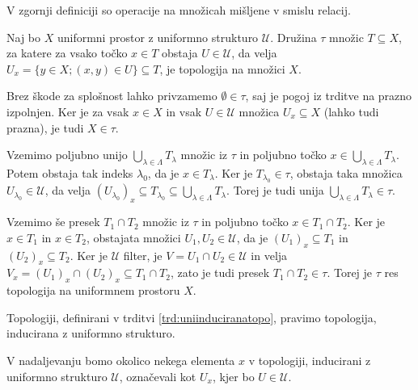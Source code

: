 \documentclass[mat1]{fmfdelo}
\newcommand{\Ucurl}{\mathcal{U}}
\begin{document}
\begin{opomba}
	V zgornji definiciji so operacije na množicah mišljene v smislu relacij.
\end{opomba}

\begin{trditev}\label{trd:uniinduciranatopo}
Naj bo $X$ uniformni prostor z uniformno strukturo $\mathcal{U}$. Družina $\tau$ množic $T \subseteq X$, za katere za vsako točko $x \in T$ obstaja $U \in \mathcal{U}$, da velja $U_x = \lbrace y \in X ; (x, y) \in U \rbrace \subseteq T$, je topologija na množici $X$.
\end{trditev}

\begin{dokaz}
Brez škode za splošnost lahko privzamemo $\emptyset \in \tau$, saj je pogoj iz trditve na prazno izpolnjen. Ker je za vsak $x \in X$ in vsak $U \in \Ucurl$ množica $U_x \subseteq X$ (lahko tudi prazna), je tudi $X \in \tau$.

Vzemimo poljubno unijo $\bigcup_{\lambda \in \Lambda} T_\lambda$ množic iz $\tau$ in poljubno točko $x \in \bigcup_{\lambda \in \Lambda} T_\lambda$. Potem obstaja
tak indeks $\lambda_0$, da je $x \in T_\lambda$. Ker je $T_{\lambda_0} \in \tau$, obstaja taka množica $U_ {\lambda_0} \in \Ucurl$, da velja $(U_{\lambda_0})_x \subseteq T_{\lambda_0} \subseteq \bigcup_{\lambda \in \Lambda} T_\lambda$. Torej je tudi unija $\bigcup_{\lambda \in \Lambda} T_\lambda \in \tau$.

Vzemimo še presek $T_1 \cap T_2$ množic iz $\tau$ in poljubno točko $x \in T_1 \cap T_2$. Ker je $x \in T_1$ in $x \in T_2$, obstajata množici $U_1, U_2 \in \Ucurl$, da je $(U_{1})_x \subseteq T_1$ in $(U_{2})_x \subseteq T_2$. Ker je $\Ucurl$ filter, je $V = U_1 \cap U_2 \in \Ucurl$ in velja
$V_x = (U_{1})_x\cap (U_{2})_x \subseteq T_1 \cap T_2$, zato je tudi presek $T_1 \cap T_2 \in \tau$. Torej je $\tau$ res topologija na uniformnem prostoru $X$.
\end{dokaz}

\begin{definicija}\label{def:uniinduciranatopo}
Topologiji, definirani v trditvi \ref{trd:uniinduciranatopo}, pravimo topologija, inducirana z uniformno strukturo.
\end{definicija}

\begin{opomba}
	V nadaljevanju bomo okolico nekega elementa $x$ v topologiji, in\-du\-ci\-ra\-ni z uniformno strukturo $\mathcal{U}$, označevali kot $U_x$, kjer bo $U \in \mathcal{U}$.
\end{opomba}
\end{document}
